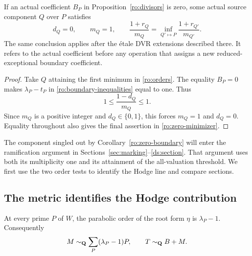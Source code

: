 \begin{corollary}
\label{ro:zero-boundary}
If an actual coefficient $B_P$ in Proposition~\ref{ro:divisors} is zero,
some actual source component $Q$ over $P$ satisfies
\begin{equation}
 d_Q=0,\qquad m_Q=1,\qquad
 \frac{1+r_Q}{m_Q}
   =\inf_{Q'\mapsto P}\frac{1+r_{Q'}}{m_{Q'}}.
 \label{ro:zero-minimizer}
\end{equation}
The same conclusion applies after the \'etale DVR extensions described
there.  It refers to the actual coefficient before any operation that
assigns a new reduced-exceptional boundary coefficient.
\end{corollary}

\begin{proof}
Take $Q$ attaining the first minimum in \eqref{ro:orders}.  The equality
$B_P=0$ makes $\lambda_P-t_P$ in
\eqref{ro:boundary-inequalities} equal to one.  Thus
\[
 1\le\frac{1-d_Q}{m_Q}\le1.
\]
Since $m_Q$ is a positive integer and $d_Q\in\{0,1\}$, this forces
$m_Q=1$ and $d_Q=0$.  Equality throughout also gives the final assertion
in \eqref{ro:zero-minimizer}.
\end{proof}

The component singled out by Corollary~\ref{ro:zero-boundary} will
enter the ramification argument in Sections~\ref{sec:marking}--\ref{ds:section}.
That argument uses both its multiplicity one and its attainment of
the all-valuation threshold. We first use the two order tests to
identify the Hodge line and compare sections.

\subsection{The metric identifies the Hodge contribution}

\begin{proposition}
\label{ro:metric}
At every prime $P$ of $W$, the parabolic order of the root form $\eta$ is
$\lambda_P-1$.  Consequently
\begin{equation}
 M\sim_{\mathbf Q}\sum_P(\lambda_P-1)P,
 \qquad
 T\sim_{\mathbf Q}B+M.
 \label{ro:metric-identity}
\end{equation}
\end{proposition}

